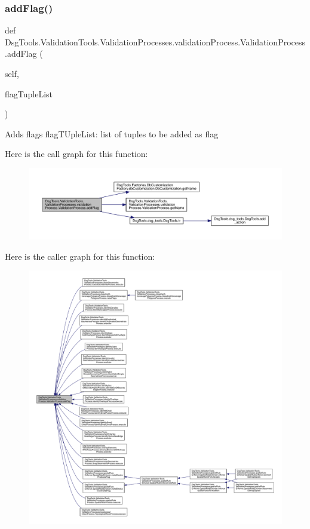 \subsubsection{\texorpdfstring{add\+Flag()}{addFlag()}}
{\footnotesize\ttfamily def Dsg\+Tools.\+Validation\+Tools.\+Validation\+Processes.\+validation\+Process.\+Validation\+Process.\+add\+Flag (\begin{DoxyParamCaption}\item[{}]{self,  }\item[{}]{flag\+Tuple\+List }\end{DoxyParamCaption})}

\begin{DoxyVerb}Adds flags
flagTUpleList: list of tuples to be added as flag
\end{DoxyVerb}
 Here is the call graph for this function\+:
\nopagebreak
\begin{figure}[H]
\begin{center}
\leavevmode
\includegraphics[width=350pt]{class_dsg_tools_1_1_validation_tools_1_1_validation_processes_1_1validation_process_1_1_validation_process_a57cad7b940bc478076d12aca952d0a8c_cgraph}
\end{center}
\end{figure}
Here is the caller graph for this function\+:
\nopagebreak
\begin{figure}[H]
\begin{center}
\leavevmode
\includegraphics[width=350pt]{class_dsg_tools_1_1_validation_tools_1_1_validation_processes_1_1validation_process_1_1_validation_process_a57cad7b940bc478076d12aca952d0a8c_icgraph}
\end{center}
\end{figure}
